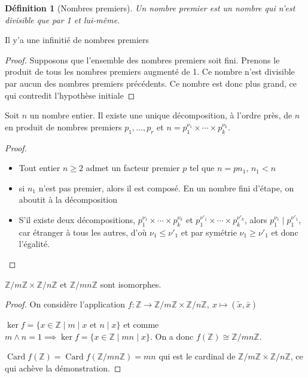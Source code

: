 \documentclass[french]{article}
\newtheorem{definition}{Définition}
\newcommand{\Z}{\mathbb{Z}}
\begin{document}
  \begin{definition}[Nombres premiers]
    Un nombre premier est un nombre qui n'est divisible que par 1 et
    lui-même.
  \end{definition}
  \begin{theorem}
    Il y'a une infinitié de nombres premiers
  \end{theorem}
  \begin{proof}
    Supposons que l'ensemble des nombres premiers soit fini. Prenons le
    produit de tous les nombres premiers augmenté de 1. Ce nombre n'est
    divisible par aucun des nombres premiers précédents. Ce nombre est
    donc plus grand, ce qui contredit l'hypothèse initiale
  \end{proof}

  \begin{theorem}[Décomposition]
    Soit $n$ un nombre entier. Il existe une unique décomposition, à
    l'ordre près, de $n$ en produit de nombres premiers $p_1,\dots,p_r$
    et $n = p_1^{\nu_1}\times\cdots\times p_k^{\nu_k}$.
  \end{theorem}
  \begin{proof}
    \begin{itemize}
      \item Tout entier $n\geq 2$ admet un facteur premier $p$ tel que
        $n=pn_1$, $n_1<n$
      \item si $n_1$ n'est pas premier, alors il est composé. En un
        nombre fini d'étape, on aboutit à la décomposition
      \item S'il existe deux décompositions, $p_1^{\nu_1}\times
        \cdots\times p_k^{\nu_k}$ et $p_1^{\nu'_1}\times \cdots\times
        p_k^{\nu'_k}$, alors $p_1^{\nu_1} \mid p_1^{\nu'_1}$, car
        étranger à tous les autres, d'où $\nu_1 \leq \nu'_1$ et par
        symétrie $\nu_1 \geq \nu'_1$ et donc l'égalité.
    \end{itemize}
  \end{proof}


  \begin{theorem}
    $\Z/m\Z\times \Z/n\Z$ et $\Z/mn\Z$ sont isomorphes.
  \end{theorem}
  \begin{proof}
    On considère l'application $f:\Z\to\Z/m\Z\times\Z/n\Z,\ x\mapsto
    (\tilde{x},\bar{x})$

    $\ker f = \lbrace x\in \Z \mid m \mid x\text{ et } n \mid x \rbrace$
    et comme $m\wedge n = 1 \implies \ker f = \lbrace x\in \Z \mid mn
    \mid x \rbrace$. On a donc $f(\Z) \cong \Z/mn\Z$.

    $\mathop{Card}f(\Z) = \mathop{Card}f(\Z/mn\Z) = mn$ qui est le
    cardinal de $\Z/m\Z\times \Z/n\Z$, ce qui achève la démonstration.
  \end{proof}
\end{document}

